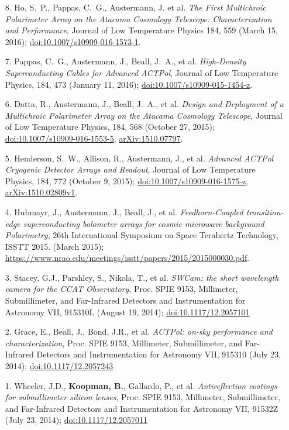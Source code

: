 \documentclass[margin,line]{res}
\begin{document}
\begin{resume}
\begin{enumerate}
\item[{8.}] Ho, S.~P., Pappas, C.~G., Austermann, J. et al. \textit{The First
    Multichroic Polarimeter Array on the Atacama Cosmology Telescope:
    Characterization and Performance}, Journal of Low Temperature Physics 184, 559 (March 15, 2016);
    \href{http://dx.doi.org/10.1007/s10909-016-1573-1}{doi:10.1007/s10909-016-1573-1}.
\item[{7.}] Pappas, C.~G., Austermann, J., Beall, J.~A., et al.
    \textit{High-Density Superconducting Cables for Advanced ACTPol}, Journal of Low
    Temperature Physics, 184, 473 (January 11, 2016);
    \href{http://dx.doi.org/10.1007/s10909-015-1454-z}{doi:10.1007/s10909-015-1454-z}.
\item[{6.}] Datta, R., Austermann, J., Beall, J.~A., et al. \textit{Design and
    Deployment of a Multichroic Polarimeter Array on the Atacama Cosmology
    Telescope}, Journal of Low Temperature Physics, 184, 568 (October 27, 2015);
    \href{http://dx.doi.org/10.1007/s10909-016-1553-5}{doi:10.1007/s10909-016-1553-5},
    \href{http://arxiv.org/abs/1510.07797}{arXiv:1510.07797}.
\item[{5.}] Henderson, S.~W., Allison, R., Austermann, J., et al.
    \textit{Advanced ACTPol Cryogenic Detector Arrays and Readout}, Journal of Low
    Temperature Physics, 184, 772 (October 9, 2015);
    \href{http://dx.doi.org/10.1007/s10909-016-1575-z}{doi:10.1007/s10909-016-1575-z},
    \href{http://arxiv.org/abs/1510.02809v1}{arXiv:1510.02809v1}.
\item[{4.}] Hubmayr, J., Austermann, J., Beall, J., et al. \textit{Feedhorn-Coupled
    transition-edge superconducting bolometer arrays for cosmic microwave
    background Polarimetry}, 26th International Symposium on Space Terahertz
    Technology, ISSTT 2015. (March 2015);\\
    \href{https://www.nrao.edu/meetings/isstt/papers/2015/2015000030.pdf}{https://www.nrao.edu/meetings/isstt/papers/2015/2015000030.pdf}.
\item[{3.}] Stacey, G.J., Parshley, S., Nikola, T., et al.
    \textit{SWCam: the short wavelength camera for the CCAT Observatory},
    Proc. SPIE 9153, Millimeter, Submillimeter, and Far-Infrared Detectors and Instrumentation for Astronomy VII, 
    915310L (August 19, 2014); \href{http://dx.doi.org/10.1117/12.2057101}{doi:10.1117/12.2057101}
\item[{2.}] Grace, E., Beall, J., Bond, J.R., et al.
    \textit{ACTPol: on-sky performance and characterization},
    Proc. SPIE 9153, Millimeter, Submillimeter, and Far-Infrared Detectors and Instrumentation for Astronomy VII, 
    915310 (July 23, 2014); \href{http://dx.doi.org/10.1117/12.2057243}{doi:10.1117/12.2057243}
\item[{1.}] Wheeler, J.D., \textbf{Koopman, B.}, Gallardo, P., et al.
    \textit{Antireflection coatings for submillimeter silicon lenses},
    Proc. SPIE 9153, Millimeter, Submillimeter, and Far-Infrared Detectors and Instrumentation for Astronomy VII, 
    91532Z (July 23, 2014); \href{http://dx.doi.org/10.1117/12.2057011}{doi:10.1117/12.2057011}
\end{enumerate}


\end{resume}
\end{document}
